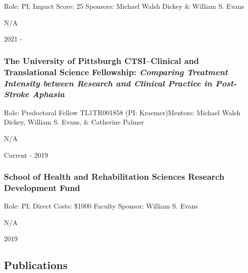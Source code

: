 \documentclass[
]{article}
\begin{document}
Role: PI; Impact Score: 25 Sponsors: Michael Walsh Dickey \& William S.
Evans

N/A

2021 -

\hypertarget{the-university-of-pittsburgh-ctsiclinical-and-translational-science-fellowship-comparing-treatment-intensity-between-research-and-clinical-practice-in-post-stroke-aphasia}{%
\subsubsection{\texorpdfstring{The University of Pittsburgh
CTSI--Clinical and Translational Science Fellowship: \emph{Comparing
Treatment Intensity between Research and Clinical Practice in
Post-Stroke
Aphasia}}{The University of Pittsburgh CTSI--Clinical and Translational Science Fellowship: Comparing Treatment Intensity between Research and Clinical Practice in Post-Stroke Aphasia}}\label{the-university-of-pittsburgh-ctsiclinical-and-translational-science-fellowship-comparing-treatment-intensity-between-research-and-clinical-practice-in-post-stroke-aphasia}}

Role: Predoctoral Fellow TL1TR001858 (PI: Kraemer)Mentors: Michael Walsh
Dickey, William S. Evans, \& Catherine Palmer

N/A

Current - 2019

\hypertarget{school-of-health-and-rehabilitation-sciences-research-development-fund}{%
\subsubsection{School of Health and Rehabilitation Sciences Research
Development
Fund}\label{school-of-health-and-rehabilitation-sciences-research-development-fund}}

Role: PI; Direct Costs: \$1000 Faculty Sponsor: William S. Evans

N/A

2019

\hypertarget{publications}{%
\subsection{Publications}\label{publications}}

\hypertarget{section}{%
\subsubsection{}\label{section}}
\end{document}
